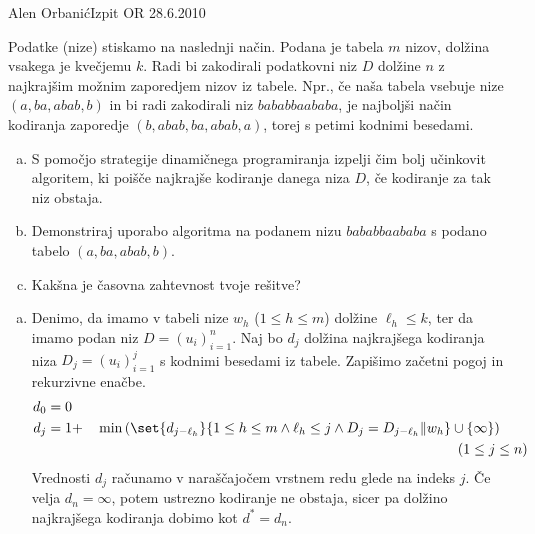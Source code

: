 \begin{naloga}{Alen Orbanić}{Izpit OR 28.6.2010}
\begin{vprasanje}
Podatke (nize) stiskamo na naslednji način.
Podana je tabela $m$ nizov, dolžina vsakega je kvečjemu $k$.
Radi bi zakodirali podatkovni niz $D$ dolžine $n$
z najkrajšim možnim zaporedjem nizov iz tabele.
Npr., če naša tabela vsebuje nize $(a, ba, abab, b)$
in bi radi zakodirali niz $bababbaababa$,
je najboljši način kodiranja zaporedje $(b, abab, ba, abab, a)$,
torej s petimi kodnimi besedami.

\begin{enumerate}[(a)]
\item S pomočjo strategije dinamičnega programiranja
izpelji čim bolj učinkovit algoritem,
ki poišče najkrajše kodiranje danega niza $D$,
če kodiranje za tak niz obstaja.

\item Demonstriraj uporabo algoritma na podanem nizu $bababbaababa$
s podano tabelo $(a, ba, abab, b)$.

\item Kakšna je časovna zahtevnost tvoje rešitve?
\end{enumerate}
\end{vprasanje}

\begin{odgovor}
\begin{enumerate}[(a)]
\item Denimo,
da imamo v tabeli nize $w_h$ ($1 \le h \le m$) dolžine $\ell_h \le k$,
ter da imamo podan niz $D = (u_i)_{i=1}^n$.
Naj bo $d_j$ dolžina najkrajšega kodiranja niza $D_j = (u_i)_{i=1}^j$
s kodnimi besedami iz tabele.
Zapišimo začetni pogoj in rekurzivne enačbe.
\begin{alignat*}{2}
d_0 &= 0 \\
d_j &= 1 + &{} \min\left(\set{d_{j-\ell_h}}{1 \le h \le m \land
                              \ell_h \le j \land D_j = D_{j-\ell_h} \| w_h}
                         \cup \{\infty\}\right) \qquad \\
&& (1 \le j \le n)
\end{alignat*}
Vrednosti $d_j$ računamo v naraščajočem vrstnem redu glede na indeks $j$.
Če velja $d_n = \infty$, potem ustrezno kodiranje ne obstaja,
sicer pa dolžino najkrajšega kodiranja dobimo kot $d^* = d_n$.


\end{enumerate}
\end{odgovor}
\end{naloga}
